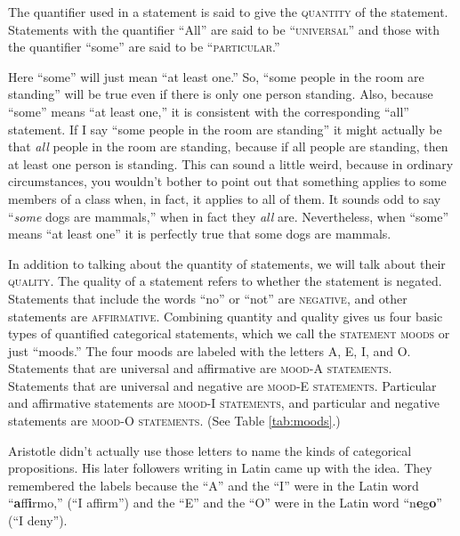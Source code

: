 The quantifier used in a statement is said to give the \textsc{\gls{quantity}} \label{def:Quantity} of the statement. Statements with the quantifier ``All'' are said to be ``\textsc{\gls{universal}}'' and those with the quantifier ``some'' are said to be ``\textsc{\gls{particular}}.''

Here ``some'' will just mean ``at least one.'' So, ``some people in the room are standing'' will be true even if there is only one person standing. Also, because ``some'' means ``at least one,'' it is consistent with the corresponding ``all'' statement. If I say ``some people in the room are standing'' it might actually be that \emph{all} people in the room are standing, because if all people are standing, then at least one person is standing. This can sound a little weird, because in ordinary circumstances, you wouldn't bother to point out that something applies to some members of a class when, in fact, it applies to all of them. It sounds odd to say ``\emph{some} dogs are mammals,'' when in fact they \emph{all} are. Nevertheless, when ``some'' means ``at least one'' it is perfectly true that some dogs are mammals.


In addition to talking about the quantity of statements, we will talk about their \textsc{\gls{quality}}. \label{def:quality} The quality of a statement refers to whether the statement is negated. Statements that include the words ``no'' or ``not'' are \textsc{\gls{negative}}, and other statements are \textsc{\gls{affirmative}}. Combining quantity and quality gives us four basic types of quantified categorical statements, which we call the \textsc{\glspl{statement mood}} or just ``moods.'' The four moods are labeled with the letters A, E, I, and O. Statements that are universal and affirmative are \textsc{\glspl{mood-A statement}}. Statements that are universal and negative are \textsc{\glspl{mood-E statement}}. Particular and affirmative statements are \textsc{\glspl{mood-I statement}}, and particular and negative statements are \textsc{\glspl{mood-O statement}}. (See Table \ref{tab:moods}.)


Aristotle didn't actually use those letters to name the kinds of categorical propositions. His later followers writing in Latin came up with the idea. They remembered the labels because the ``A'' and the ``I'' were in the Latin word ``\textbf{a}ff\textbf{i}rmo,'' (``I affirm'') and the ``E'' and the ``O'' were in the Latin word ``n\textbf{e}g\textbf{o}'' (``I deny'').

